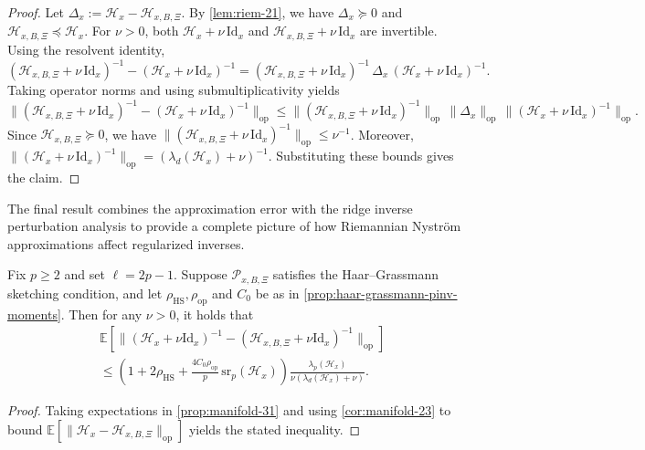 \documentclass[final,onefignum,onetabnum]{siamart250211}
\begin{document}
\begin{proof}
Let $\Delta_x:=\mathcal{H}_x-\mathcal{H}_{x,B,\Xi}$. By \cref{lem:riem-21}, we have $\Delta_x\succeq 0$ and $\mathcal{H}_{x,B,\Xi}\preceq \mathcal{H}_x$.
For $\nu>0$, both $\mathcal{H}_x+\nu\,\mathrm{Id}_x$ and $\mathcal{H}_{x,B,\Xi}+\nu\,\mathrm{Id}_x$ are invertible.
Using the resolvent identity,
\[
(\mathcal{H}_{x,B,\Xi}+\nu\,\mathrm{Id}_x)^{-1}-(\mathcal{H}_x+\nu\,\mathrm{Id}_x)^{-1}
=(\mathcal{H}_{x,B,\Xi}+\nu\,\mathrm{Id}_x)^{-1}\,\Delta_x\,(\mathcal{H}_x+\nu\,\mathrm{Id}_x)^{-1}.
\]
Taking operator norms and using submultiplicativity yields
$
\big\|(\mathcal{H}_{x,B,\Xi}+\nu\,\mathrm{Id}_x)^{-1}-(\mathcal{H}_x+\nu\,\mathrm{Id}_x)^{-1}\big\|_{\mathrm{op}} 
  \le
  \|(\mathcal{H}_{x,B,\Xi}+\nu\,\mathrm{Id}_x)^{-1}\|_{\mathrm{op}}\,\|\Delta_x\|_{\mathrm{op}}\,\|(\mathcal{H}_x+\nu\,\mathrm{Id}_x)^{-1}\|_{\mathrm{op}}.
$
Since $\mathcal{H}_{x,B,\Xi}\succeq 0$, we have $\|(\mathcal{H}_{x,B,\Xi}+\nu\,\mathrm{Id}_x)^{-1}\|_{\mathrm{op}}\le \nu^{-1}$.
Moreover, $\|(\mathcal{H}_x+\nu\,\mathrm{Id}_x)^{-1}\|_{\mathrm{op}}=(\lambda_d(\mathcal{H}_x)+\nu)^{-1}$.
Substituting these bounds gives the claim.
\end{proof}

The final result combines the approximation error with the ridge inverse perturbation analysis to provide a complete picture of how Riemannian Nystr\"om approximations affect regularized inverses. 

\begin{proposition}
  \label{prop:manifold-42}
  Fix $p\ge 2$ and set $\ell=2p-1$.
  Suppose $\mathcal{P}_{x, B, \Xi}$ satisfies the Haar--Grassmann sketching condition, and let $\rho_{\mathrm{HS}},\rho_{\mathrm{op}}$ and $C_0$ be as in \cref{prop:haar-grassmann-pinv-moments}.
  Then for any $\nu>0$, it holds that
  \[
  \begin{aligned} 
  & \mathbb E\left[\big\|(\mathcal{H}_x+\nu \mathrm{Id}_x)^{-1}-(\mathcal{H}_{x, B, \Xi}+\nu \mathrm{Id}_x)^{-1}\big\|_{\mathrm{op}}\right]
  \\
  &
  \le
  \left(1+2\rho_{\mathrm{HS}}+\frac{4C_0\rho_{\mathrm{op}}}{p}\,\mathrm{sr}_p(\mathcal{H}_x)\right)
  \frac{\lambda_p(\mathcal{H}_x)}{\nu(\lambda_d(\mathcal{H}_x)+\nu)}.
  \end{aligned}
  \]
\end{proposition}

\begin{proof}
Taking expectations in \cref{prop:manifold-31} and using \cref{cor:manifold-23} to bound $\mathbb E [ \|\mathcal{H}_x-\mathcal{H}_{x,B,\Xi}\|_{\mathrm{op}} ]$ yields the stated inequality.
\end{proof}
\end{document}
